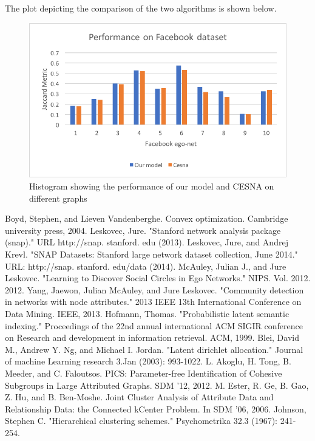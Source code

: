\documentclass[11pt]{article}
\begin{document}
The plot depicting the comparison of the two algorithms is shown below.
\begin{figure}[H]
\begin{center}
\includegraphics[scale=1]{plot.png}
\caption{Histogram showing the performance of our model and CESNA on different graphs}
\end{center}
\end{figure}
\begin{thebibliography}{3}
Boyd, Stephen, and Lieven Vandenberghe. Convex optimization. Cambridge university press, 2004.
Leskovec, Jure. "Stanford network analysis package (snap)." URL http://snap. stanford. edu (2013).
Leskovec, Jure, and Andrej Krevl. "SNAP Datasets: Stanford large network dataset collection, June 2014." URL: http://snap. stanford. edu/data (2014).
McAuley, Julian J., and Jure Leskovec. "Learning to Discover Social Circles in Ego Networks." NIPS. Vol. 2012. 2012.
Yang, Jaewon, Julian McAuley, and Jure Leskovec. "Community detection in networks with node attributes." 2013 IEEE 13th International Conference on Data Mining. IEEE, 2013.
Hofmann, Thomas. "Probabilistic latent semantic indexing." Proceedings of the 22nd annual international ACM SIGIR conference on Research and development in information retrieval. ACM, 1999.
Blei, David M., Andrew Y. Ng, and Michael I. Jordan. "Latent dirichlet allocation." Journal of machine Learning research 3.Jan (2003): 993-1022.
 L. Akoglu, H. Tong, B. Meeder, and C. Faloutsos. PICS: Parameter-free
Identification of Cohesive Subgroups in Large Attributed Graphs. SDM
’12, 2012.
M. Ester, R. Ge, B. Gao, Z. Hu, and B. Ben-Moshe. Joint Cluster
Analysis of Attribute Data and Relationship Data: the Connected kCenter
Problem. In SDM ’06, 2006.
Johnson, Stephen C. "Hierarchical clustering schemes." Psychometrika 32.3 (1967): 241-254.
\end{thebibliography}
\end{document}
